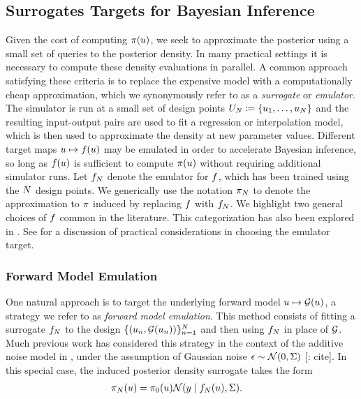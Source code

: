 \documentclass[12pt]{article}
\begin{document}
\subsection{Surrogates Targets for Bayesian Inference} \label{sec:surrogates-Bayes}
Given the cost of computing $\pi(u)$, we seek to approximate
the posterior using a small set of queries to the posterior density.
In many practical settings it is necessary to compute these density 
evaluations in parallel. A common approach satisfying these criteria is 
to replace the expensive model with a computationally cheap approximation, 
which we synonymously refer to as a \textit{surrogate} or \textit{emulator}.
The simulator is run at a small set of design points 
$U_{N} \coloneqq \{u_1, \dots, u_{N}\}$ and the resulting input-output
pairs are used to fit a regression or interpolation model, which is then used to 
approximate the density at new parameter values. Different target maps 
$u \mapsto f(u)$ may be emulated in order to accelerate Bayesian 
inference, so long as $f(u)$ is sufficient to compute $\pi(u)$
without requiring additional simulator runs. Let $f_{N}$ denote the 
emulator for $f$, which has been trained using the $N$
design points. We generically use the notation $\pi_{N}$ to denote 
the approximation to $\pi$ induced by replacing $f$
with $f_{N}$. We highlight two general 
choices of $f$ common in the literature. This categorization has also 
been explored in \citet{StuartTeck1,StuartTeck2,GP_PDE_priors}. See
\citet{reviewPaper} for a discussion of practical considerations in choosing 
the emulator target. 

\subsubsection{Forward Model Emulation}
One natural approach is to target the underlying forward model 
$u \mapsto \mathcal{G}(u)$, a strategy we refer to as \textit{forward model emulation}.
This method consists of fitting a surrogate $f_{N}$ to the design 
$\{(u_n, \mathcal{G}(u_n))\}_{n=1}^{N}$ and then using $f_{N}$
in place of $\mathcal{G}$. Much previous work has considered this strategy 
in the context of the additive noise model in ,
under the assumption of Gaussian noise $\epsilon \sim \mathcal{N}(0, \Sigma)$ [\todo: cite].
In this special case, the induced posterior density surrogate takes the form
\begin{align}
\pi_{N}(u) &= \pi_0(u) \mathcal{N}(y \mid f_{N}(u), \Sigma). \label{eq:post-em-fwd-Gaussian}
\end{align}
\end{document}
